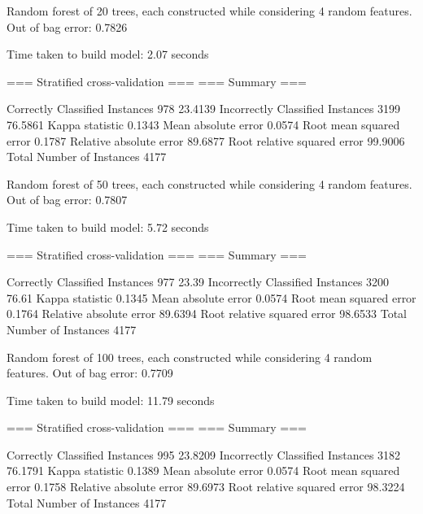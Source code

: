 Random forest of 20 trees, each constructed while considering 4 random features.
Out of bag error: 0.7826



Time taken to build model: 2.07 seconds

=== Stratified cross-validation ===
=== Summary ===

Correctly Classified Instances         978               23.4139 %
Incorrectly Classified Instances      3199               76.5861 %
Kappa statistic                          0.1343
Mean absolute error                      0.0574
Root mean squared error                  0.1787
Relative absolute error                 89.6877 %
Root relative squared error             99.9006 %
Total Number of Instances             4177     




Random forest of 50 trees, each constructed while considering 4 random features.
Out of bag error: 0.7807



Time taken to build model: 5.72 seconds

=== Stratified cross-validation ===
=== Summary ===

Correctly Classified Instances         977               23.39   %
Incorrectly Classified Instances      3200               76.61   %
Kappa statistic                          0.1345
Mean absolute error                      0.0574
Root mean squared error                  0.1764
Relative absolute error                 89.6394 %
Root relative squared error             98.6533 %
Total Number of Instances             4177



Random forest of 100 trees, each constructed while considering 4 random features.
Out of bag error: 0.7709



Time taken to build model: 11.79 seconds

=== Stratified cross-validation ===
=== Summary ===

Correctly Classified Instances         995               23.8209 %
Incorrectly Classified Instances      3182               76.1791 %
Kappa statistic                          0.1389
Mean absolute error                      0.0574
Root mean squared error                  0.1758
Relative absolute error                 89.6973 %
Root relative squared error             98.3224 %
Total Number of Instances             4177
